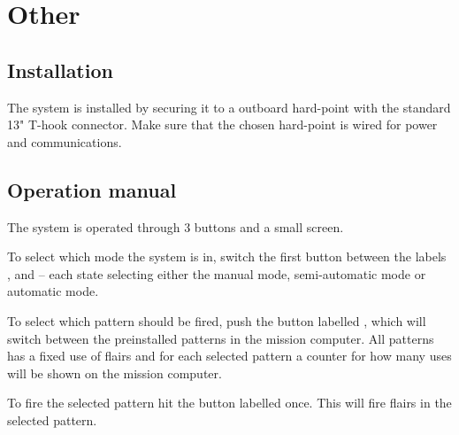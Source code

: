 \documentclass[Main]{subfiles}
\begin{document}
\chapter{Other}

\section{Installation}
The system is installed by securing it to a outboard hard-point with the standard 13" T-hook connector. 
Make sure that the chosen hard-point is wired for power and communications.




\section{Operation manual}
The system is operated through 3 buttons and a small screen.

To select which mode the system is in, switch the first button between the labels ,  and  -- each state selecting either the manual mode, semi-automatic mode or automatic mode.

To select which pattern should be fired, push the button labelled , which will switch between the preinstalled patterns in the mission computer.
All patterns has a fixed use of flairs and for each selected pattern a counter for how many uses will be shown on the mission computer.

To fire the selected pattern hit the button labelled  once.
This will fire flairs in the selected pattern.
\end{document}
